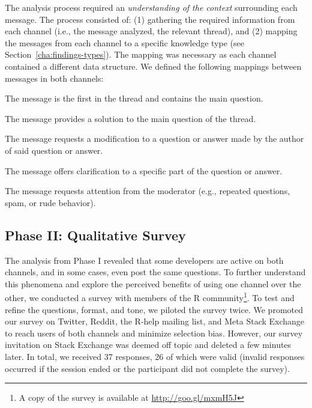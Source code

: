 \documentclass[smallextended]{svjour3}       %
\newcommand{\RH}{R-help\xspace}
\begin{document}
		  
		
					
					
The analysis process required an \textit{understanding of the context} surrounding each message. The process consisted of: (1) gathering the required information from each channel (i.e., the message analyzed, the relevant thread), and (2) mapping the messages from each channel to a specific knowledge type (see Section~\ref{cha:findings-types}). The mapping was necessary as each channel contained a different data structure.
We defined the following mappings between messages in both channels:

	\begin{description}[itemsep=1pt, topsep=2pt, leftmargin=1em, parsep=0pt]
		\item[\textbf{Question:}] The message is the first in the thread and contains the main question.
		\item[\textbf{Answer:}] The message provides a solution to the main question of the thread.
	 	\item[\textbf{Update:}] The message requests a modification to a question or answer made by the author of said question or answer.
		\item[\textbf{Comment:}] The message offers clarification to a specific part of the question or answer.
		\item[\textbf{Flag:}] The message requests attention from the moderator (e.g., repeated questions, spam, or rude behavior).
	\end{description}


\subsection{Phase II: Qualitative Survey}

The analysis from Phase I revealed that some developers are active on both channels, and in some cases, even post the same questions. To further understand this phenomena and explore the perceived benefits of using one channel over the other, we conducted a survey with members of the R community\footnote{A copy of the survey is available at \url{http://goo.gl/mxmH5J}}. 
To test and refine the questions, format, and tone, we piloted the survey twice. 
We promoted our survey on Twitter, Reddit, the \RH mailing list, and Meta Stack Exchange to reach users of both channels and minimize selection bias. However, our survey invitation on Stack Exchange was deemed off topic and deleted a few minutes later. In total, we received 37 responses, 26 of which were valid (invalid responses occurred if the session ended or the participant did not complete the survey).
\end{document}
